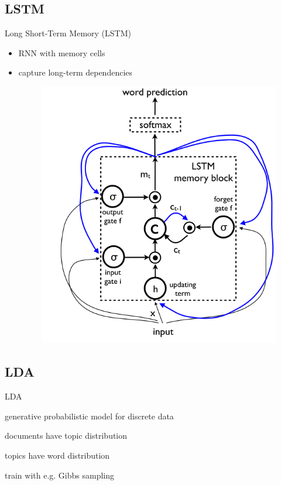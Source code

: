 \documentclass[16pt]{beamer}
\newenvironment{wideitemize}{\itemize\addtolength{\itemsep}{10pt}}{\enditemize}
\begin{document}
\subsection{LSTM}%
\begin{frame}{Long Short-Term Memory (LSTM)}{\cite{SeppHochreiter1997}}
\begin{itemize}
\item RNN with memory cells
\item capture long-term dependencies
\begin{figure}[tb]
           \centering
           \includegraphics[scale=0.4]{lstm.PNG}
           \\\cite{Google}
\end{figure}

\end{itemize}
\end{frame}



\subsection{LDA}%
\begin{frame}{LDA }{\cite{Blei2012}}
\begin{wideitemize}
\item generative probabilistic model for discrete data
\item documents have topic distribution
\item topics have word distribution
\item train with e.g. Gibbs sampling

\end{wideitemize}
\end{frame}
\end{document}
